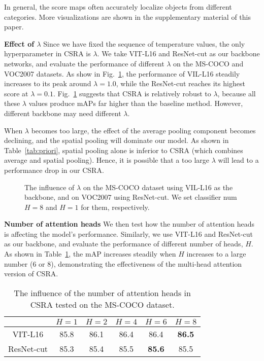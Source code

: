 \documentclass[10pt,twocolumn,letterpaper]{article}
\begin{document}
In general, the score maps often accurately localize objects from different categories. More visualizations are shown in the supplementary material of this paper.

\vspace{6pt}\noindent\textbf{Effect of $\lambda$} Since we have fixed the sequence of temperature values, the only hyperparameter in CSRA is $\lambda$. We take VIT-L16 and ResNet-cut as our backbone networks, and evaluate the performance of different $\lambda$ on the MS-COCO and VOC2007 datasets. As show in Fig.~\ref{fig:lam}, the performance of VIL-L16 steadily increases to its peak around $\lambda=1.0$, while the ResNet-cut reaches its highest score at $\lambda = 0.1$. Fig.~\ref{fig:lam} suggests that CSRA is relatively robust to $\lambda$, because all these $\lambda$ values produce mAPs far higher than the baseline method. However, different backbone may need different $\lambda$.

When $\lambda$ becomes too large, the effect of the average pooling component becomes declining, and the spatial pooling will dominate our model. As shown in Table~\ref{tab:priori}, spatial pooling alone is inferior to CSRA (which combines average and spatial pooling). Hence, it is possible that a too large $\lambda$ will lead to a performance drop in our CSRA.

\begin{figure}
	\centering
	\caption{The influence of $\lambda$ on the MS-COCO dataset using VIL-L16 as the backbone, and on VOC2007 using ResNet-cut. We set classifier num $H=8$ and $H=1$ for them, respectively.}
	\label{fig:lam}
\end{figure}

\vspace{6pt}\noindent\textbf{Number of attention heads} We then test how the number of attention heads is affecting the model's performance. Similarly, we use VIT-L16 and ResNet-cut as our backbone, and evaluate the performance of different number of heads, $H$. As shown in Table~\ref{tab:head}, the mAP increases steadily when $H$ increases to a large number (6 or 8), demonstrating the effectiveness of the multi-head attention version of CSRA.

\begin{table}
	\caption{The influence of the number of attention heads in CSRA tested on the MS-COCO dataset.}
	\label{tab:head}
	\centering
	\small
	\setlength{\tabcolsep}{3.2pt}
	\begin{tabular}{c|ccccc}
		\hline
		           & $H=1$ & $H=2$ & $H=4$ & $H=6$         & $H=8$         \\ \hline \hline
		VIT-L16    & 85.8  & 86.1  & 86.4  & 86.4          & \textbf{86.5} \\ \hline
		ResNet-cut & 85.3  & 85.4  & 85.5  & \textbf{85.6} & 85.5          \\ \hline
	\end{tabular}
\end{table}
\end{document}
